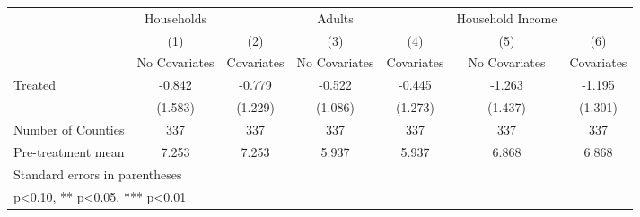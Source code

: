 {
\def\sym#1{\ifmmode^{#1}\else\(^{#1}\)\fi}
\begin{tabular}{l*{6}{c}}
\hline\hline
            &  Households   &               &      Adults   &               &Household Income   &               \\
            &\multicolumn{1}{c}{(1)}&\multicolumn{1}{c}{(2)}&\multicolumn{1}{c}{(3)}&\multicolumn{1}{c}{(4)}&\multicolumn{1}{c}{(5)}&\multicolumn{1}{c}{(6)}\\
            &\multicolumn{1}{c}{No Covariates}&\multicolumn{1}{c}{Covariates}&\multicolumn{1}{c}{No Covariates}&\multicolumn{1}{c}{Covariates}&\multicolumn{1}{c}{No Covariates}&\multicolumn{1}{c}{Covariates}\\
\hline
Treated     &      -0.842   &      -0.779   &      -0.522   &      -0.445   &      -1.263   &      -1.195   \\
            &     (1.583)   &     (1.229)   &     (1.086)   &     (1.273)   &     (1.437)   &     (1.301)   \\
\hline
Number of Counties&         337   &         337   &         337   &         337   &         337   &         337   \\
Pre-treatment mean&       7.253   &       7.253   &       5.937   &       5.937   &       6.868   &       6.868   \\
\hline\hline
\multicolumn{7}{l}{\footnotesize Standard errors in parentheses}\\
\multicolumn{7}{l}{\footnotesize * p<0.10, ** p<0.05, *** p<0.01}\\
\end{tabular}
}
